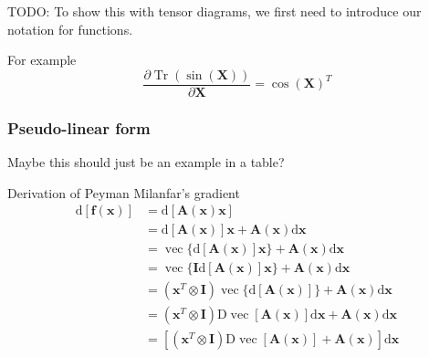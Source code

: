 TODO: To show this with tensor diagrams, we first need to introduce our notation for functions.

For example
$$
\frac{\partial \operatorname{Tr}(\sin (\mathbf{X}))}{\partial \mathbf{X}}=\cos (\mathbf{X})^T
$$


\subsubsection{Pseudo-linear form}
Maybe this should just be an example in a table?

Derivation of Peyman Milanfar's gradient
\begin{align*}
\mathrm{d}[\mathbf{f}(\mathbf{x})] & =\mathrm{d}[\mathbf{A}(\mathbf{x}) \mathbf{x}] \\
& =\mathrm{d}[\mathbf{A}(\mathbf{x})] \mathbf{x}+\mathbf{A}(\mathbf{x}) \mathrm{d} \mathbf{x} \\
& =\operatorname{vec}\{\mathrm{d}[\mathbf{A}(\mathbf{x})] \mathbf{x}\}+\mathbf{A}(\mathbf{x}) \mathrm{d} \mathbf{x} \\
& =\operatorname{vec}\{\mathbf{I} \mathrm{d}[\mathbf{A}(\mathbf{x})] \mathbf{x}\}+\mathbf{A}(\mathbf{x}) \mathrm{d} \mathbf{x} \\
& =\left(\mathbf{x}^T \otimes \mathbf{I}\right) \operatorname{vec}\{\mathrm{d}[\mathbf{A}(\mathbf{x})]\}+\mathbf{A}(\mathbf{x}) \mathrm{d} \mathbf{x} \\
& =\left(\mathbf{x}^T \otimes \mathbf{I}\right) \mathrm{D} \operatorname{vec}[\mathbf{A}(\mathbf{x})] \mathrm{d} \mathbf{x}+\mathbf{A}(\mathbf{x}) \mathrm{d} \mathbf{x} \\
& =\left[\left(\mathbf{x}^T \otimes \mathbf{I}\right) \mathrm{D} \operatorname{vec}[\mathbf{A}(\mathbf{x})]+\mathbf{A}(\mathbf{x})\right] \mathrm{d} \mathbf{x}
\end{align*}

